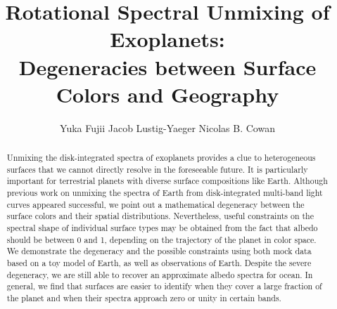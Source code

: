 \documentclass[iop,numberedappendix,apj]{emulateapj}
\begin{document}
\title{Rotational Spectral Unmixing of Exoplanets:\\Degeneracies between Surface Colors and Geography}


\author{
%
Yuka Fujii 
%
Jacob Lustig-Yaeger 
%
Nicolas B. Cowan 
%
}

      
  







\vspace{0.5\baselineskip}


\begin{abstract}

Unmixing the disk-integrated spectra of exoplanets provides a clue to heterogeneous surfaces that we cannot directly resolve in the foreseeable future. 
It is particularly important for terrestrial planets with diverse surface compositions like Earth. 
Although previous work on unmixing the spectra of Earth from disk-integrated multi-band light curves appeared successful, we point out a mathematical degeneracy between the surface colors and their spatial  distributions. 
Nevertheless, useful constraints on the spectral shape of individual surface types may be obtained from the fact that albedo should be between 0 and 1, depending on the trajectory of the planet in color space.  
We demonstrate the degeneracy and the possible constraints using both mock data based on a toy model of Earth, as well as observations of Earth. 
Despite the severe degeneracy, we are still able to recover an approximate albedo spectra for ocean. 
In general, we find that surfaces are easier to identify when they cover a large fraction of the planet and when their spectra approach zero or unity in certain bands. 
\end{abstract}
\end{document}
